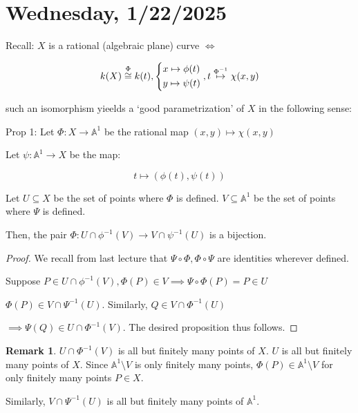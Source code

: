 \documentclass{article}
\theoremstyle{definition}
\newtheorem*{remark}{Remark}
\begin{document}
    \section*{Wednesday, 1/22/2025}
    
        Recall: \(X\) is a rational (algebraic plane) curve \(\iff\) 
        
        \[
            k(X) \overset{\Phi}{\cong} k(t), \begin{dcases}
                x \mapsto \phi(t) \\ y \mapsto \psi(t)
            \end{dcases}, t \overset{\Phi ^{-1}}{\mapsto} \chi(x,y)
        \]

        such an isomorphism yieelds a `good parametrization' of \(X\) in the following sense:

        Prop 1: Let \(\Phi: X \to \mathbb{A}^1\) be the rational map \((x,y) \mapsto \chi(x,y)\)

        Let \(\psi: \mathbb{A}^1 \to X\) be the map:

        \[
            t \mapsto (\phi(t), \psi(t))
        \]

        Let \(U \subseteq X\) be the set of points where \(\Phi\) is defined. \(V \subseteq \mathbb{A}^1\) be the set of points where \(\Psi\) is defined.

        Then, the pair \(\Phi: U \cap \phi ^{-1} (V) \to V \cap \psi ^{-1} (U)\) is a bijection.

        \begin{proof}
            We recall from last lecture that \(\Psi \circ \Phi , \Phi \circ \Psi\) are identities wherever defined. 

            Suppose \(P\in U\cap \phi ^{-1} (V), \Phi(P) \in V \implies \Psi \circ \Phi(P) = P \in U\) 

            \(\Phi(P) \in V \cap \Psi ^{-1} (U)\). Similarly, \(Q\in V \cap \Phi ^{-1} (U)\)

            \(\implies \Psi(Q) \in U \cap \Phi ^{-1} (V)\). The desired proposition thus follows.
        \end{proof}

        \begin{remark}
            \(U \cap \Phi ^{-1} (V)\) is all but finitely many points of \(X\). \(U\) is all but finitely many points of \(X\). Since \(\mathbb{A}^1 \setminus V\) is only finitely many points, \(\Phi(P) \in \mathbb{A}^1 \setminus V\) for only finitely many points \(P\in X\).

            Similarly, \(V \cap \Psi ^{-1} (U)\) is all but finitely many points of \(\mathbb{A}^1\).
        \end{remark}
\end{document}
